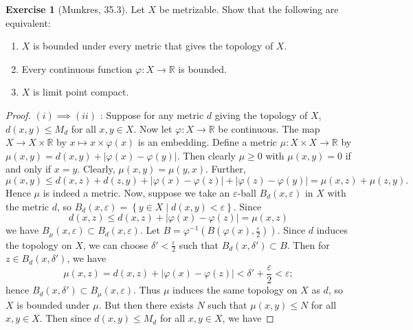 \documentclass[reqno]{amsart}
\theoremstyle{plain}%
\theoremstyle{definition}
\newtheorem{exercise}[theorem]{Exercise}
\theoremstyle{remark}
\begin{document}
\begin{exercise}[Munkres, 35.3]
    Let $X$ be metrizable. Show that the following are equivalent:
    \begin{enumerate}
        \item $X$ is bounded under every metric that gives the
            topology of $X$.
        \item Every continuous function $\varphi  \colon X \to \mathbb{R}$ 
            is bounded.
        \item $X$ is limit point compact.
    \end{enumerate}
\end{exercise}

\begin{proof}
    $(i) \implies (ii)$ : Suppose for any metric  $d$ giving the
    topology of $X$, $d(x,y) \le M_d$ for all $x,y \in X$.
    Now let $\varphi  \colon X \to \mathbb{R}$ be continuous. The map
    $X \to X \times \mathbb{R}$ by $x \mapsto x \times \varphi(x)$ is an embedding.
    Define a metric $\mu  \colon X \times X \to \mathbb{R}$ by
    $\mu (x,y) = d(x,y) + |\varphi(x) - \varphi(y)|$. Then
    clearly $\mu \ge 0$ with
    $\mu(x,y) = 0$ if and only if $x=y$. Clearly, $\mu(x,y) = \mu(y,x)$. Further,
    \[
    \mu(x,y) \le d(x,z) + d(z,y) +
    \left| \varphi(x) - \varphi(z) \right| + \left| \varphi(z) -
    \varphi(y)\right| 
    = \mu(x,z) + \mu(z,y).
    \] 
    Hence $\mu$ is indeed a metric.
    Now, suppose we take an $\varepsilon$-ball $B_{d}\left( x,\varepsilon \right) $ 
    in $X$ with the metric $d$, so
    $B_{d}(x,\varepsilon) = 
    \left\{ y \in X  \mid d(x,y) < \varepsilon \right\} $. Since
     \[
    d(x,z) \le d(x,z) + \left| \varphi(x) - \varphi(z) \right| =
    \mu (x,z)
    \] 
    we have
    $B_{\mu} (x, \varepsilon) \subset  B_d (x,\varepsilon)$.
    Let $B = \varphi^{-1}\left( B(\varphi(x), \frac{\varepsilon}{2}) \right) $.
    Since $d$ induces the topology on $X$, we can choose
    $\delta' < \frac{\varepsilon}{2}$ such that
    $B_d (x, \delta') \subset B$. Then for $z \in B_d \left( x, \delta' \right)
    $, we have
    \[
    \mu (x,z) = d(x,z) + \left| \varphi(x) - \varphi(z) \right| 
    < \delta' + \frac{\varepsilon}{2} < \varepsilon;
    \] 
    hence $B_d \left( x, \delta' \right) \subset 
    B_{\mu} \left( x, \varepsilon \right) $. Thus $\mu$ induces the same
    topology on $X$ as $d$, so $X$ is bounded under $\mu$. But then there
    exists $N$ such that
    $\mu \left( x,y \right) \le N$ for all $x,y \in X$. Then
    since $d (x,y) \le M_d$ for all $x,y \in X$, we have

\end{proof}
\end{document}
